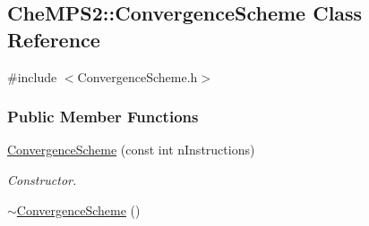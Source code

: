 \hypertarget{classCheMPS2_1_1ConvergenceScheme}{\subsection{Che\-M\-P\-S2\-:\-:Convergence\-Scheme Class Reference}
\label{classCheMPS2_1_1ConvergenceScheme}
}


{\ttfamily \#include $<$Convergence\-Scheme.\-h$>$}

\subsubsection*{Public Member Functions}
\begin{DoxyCompactItemize}
\item 
\hyperlink{classCheMPS2_1_1ConvergenceScheme_a8aa20cc325aa2c2332bec394bb05823c}{Convergence\-Scheme} (const int n\-Instructions)
\begin{DoxyCompactList}\small\item\em Constructor. \end{DoxyCompactList}\item 
\hypertarget{classCheMPS2_1_1ConvergenceScheme_af2ca92fc4ac3bbe78ae0ee252c58fab1}{\hyperlink{classCheMPS2_1_1ConvergenceScheme_af2ca92fc4ac3bbe78ae0ee252c58fab1}{$\sim$\-Convergence\-Scheme} ()}\label{classCheMPS2_1_1ConvergenceScheme_af2ca92fc4ac3bbe78ae0ee252c58fab1}


\end{DoxyCompactItemize}
